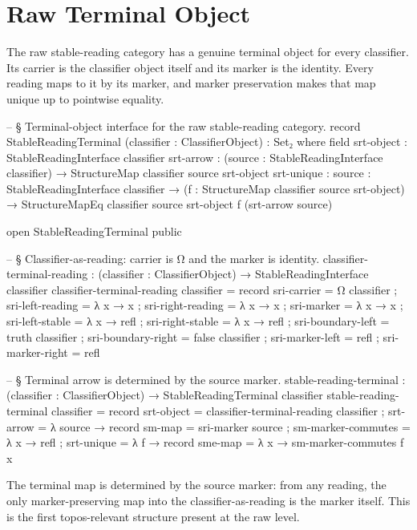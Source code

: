 \documentclass[11pt]{article}
\begin{document}
\section{Raw Terminal Object}

The raw stable-reading category has a genuine terminal object for every
classifier.  Its carrier is the classifier object itself and its marker
is the identity.  Every reading maps to it by its marker, and marker
preservation makes that map unique up to pointwise equality.

\begin{code}
-- § Terminal-object interface for the raw stable-reading category.
record StableReadingTerminal (classifier : ClassifierObject) : Set₂ where
  field
    srt-object : StableReadingInterface classifier
    srt-arrow  : (source : StableReadingInterface classifier) →
                 StructureMap classifier source srt-object
    srt-unique : {source : StableReadingInterface classifier} →
                 (f : StructureMap classifier source srt-object) →
                 StructureMapEq classifier source srt-object f (srt-arrow source)

open StableReadingTerminal public

-- § Classifier-as-reading: carrier is Ω and the marker is identity.
classifier-terminal-reading :
  (classifier : ClassifierObject) → StableReadingInterface classifier
classifier-terminal-reading classifier = record
  { sri-carrier        = Ω classifier
  ; sri-left-reading   = λ x → x
  ; sri-right-reading  = λ x → x
  ; sri-marker         = λ x → x
  ; sri-left-stable    = λ x → refl
  ; sri-right-stable   = λ x → refl
  ; sri-boundary-left  = truth classifier
  ; sri-boundary-right = false classifier
  ; sri-marker-left    = refl
  ; sri-marker-right   = refl
  }

-- § Terminal arrow is determined by the source marker.
stable-reading-terminal :
  (classifier : ClassifierObject) → StableReadingTerminal classifier
stable-reading-terminal classifier = record
  { srt-object = classifier-terminal-reading classifier
  ; srt-arrow  = λ source → record
      { sm-map             = sri-marker source
      ; sm-marker-commutes = λ x → refl
      }
  ; srt-unique = λ f → record
      { sme-map = λ x → sm-marker-commutes f x
      }
  }
\end{code}

The terminal map is determined by the source marker: from any reading,
the only marker-preserving map into the classifier-as-reading is the
marker itself.  This is the first topos-relevant structure present at the
raw level.
\end{document}
